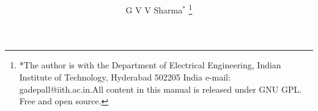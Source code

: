 \documentclass[journal,12pt,twocolumn]{IEEEtran}
\begin{document}
\title{
}
%
%
%

\author{G V V Sharma$^{*}$%
\thanks{*The author is with the Department
of Electrical Engineering, Indian Institute of Technology, Hyderabad
502205 India e-mail:  gadepall@iith.ac.in.All content in this manual is released under GNU GPL.  Free and open source.}%
}
% 
%



% 
\end{document}
